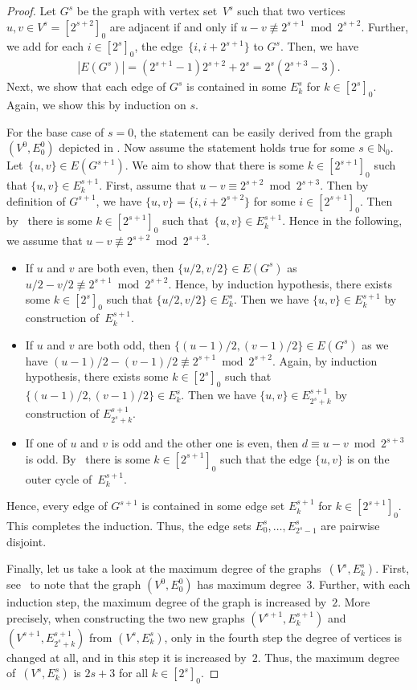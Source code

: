 \documentclass[unicode,runningheads,envcountsame,a4paper,dvipsnames,12pt]{llncs}
\newcommand{\N}{\mathbb{N}}
\begin{document}
\begin{proof}
		Let $G^s$ be the graph with vertex set~\(V^s\) such that two vertices $u, v \in V^{s} = [2^{s+2}]_0$ are adjacent if and only if $u-v \not\equiv 2^{s+1} \bmod 2^{s+2}$.
		Further, we add for each $i \in [2^{s}]_0$, the edge~$\{i,i+2^{s+1}\}$ to $G^s$. Then, we have
		\begin{align*}
			|E(G^s)|=\left(2^{s+1}-1\right)2^{s+2}+2^{s}=2^{s}(2^{s+3}-3).
		\end{align*} Next, we show that each edge of $G^s$ is contained in some \(E^s_k\) for \(k \in [2^s]_0\). Again, we show this by induction on \(s\). 
		
		For the base case of \(s=0\), the statement can be easily derived from the graph~\((V^0,E^0_0)\) depicted in . Now assume the statement holds true for some \(s \in \N_0\). Let~\(\{u,v\} \in E(G^{s+1})\). We aim to show that there is some \(k \in [2^{s+1}]_0\) such that \(\{u,v\} \in E^{s+1}_k.\) First, assume that \(u-v \equiv 2^{s+2} \bmod 2^{s+3}\). Then by definition of \(G^{s+1}\), we have \(\{u,v\}=\{i,i+2^{s+2}\}\) for some \(i \in [2^{s+1}]_0\). Then by~ there is some \(k \in [2^{s+1}]_0\) such that~\(\{u,v\} \in E^{s+1}_k.\) Hence in the following, we assume that \(u-v \not \equiv 2^{s+2} \bmod 2^{s+3}\).
		\begin{itemize}
			\item If \(u\) and \(v\) are both even, then \(\{u/2,v/2\} \in E(G^{s})\) as \(u/2-v/2 \not \equiv 2^{s+1} \bmod 2^{s+2}\). Hence, by induction hypothesis, there exists some \(k \in [2^s]_0\) such that \(\{u/2,v/2\} \in E_k^s\). Then we have \(\{u,v\} \in E_k^{s+1}\) by construction of~\(E_k^{s+1}\).
			\item If \(u\) and \(v\) are both odd, then \(\{(u-1)/2,(v-1)/2\} \in E(G^{s})\) as we have \((u-1)/2-(v-1)/2 \not \equiv 2^{s+1} \bmod 2^{s+2}\). Again, by induction hypothesis, there exists some \(k \in [2^s]_0\) such that \(\{(u-1)/2,(v-1)/2\} \in E_k^s\). Then we have \(\{u,v\} \in E_{2^s+k}^{s+1}\) by construction of \(E_{2^s+k}^{s+1}\).
			\item If one of \(u\) and \(v\) is odd and the other one is even, then \(d \equiv u-v \bmod 2^{s+3}\) is odd. By~ there is some \(k \in [2^{s+1}]_0\) such that the edge \(\{u,v\}\) is on the outer cycle of~\(E^{s+1}_k\).
		\end{itemize}
		Hence, every edge of \(G^{s+1}\) is contained in some edge set \(E^{s+1}_k\) for \(k \in [2^{s+1}]_0\). This completes the induction. Thus, the edge sets \(E^s_0, \dots, E^{s}_{2^s-1}\) are pairwise disjoint. 
		
		Finally, let us take a look at the maximum degree of the graphs~\((V^s,E^s_k)\). First, see~ to note that the graph \((V^0,E_0^0)\) has maximum degree~3. Further, with each induction step, the maximum degree of the graph is increased by~$2$. More precisely, when constructing the two new graphs $(V^{s+1}, E_{k}^{s+1})$ and~$(V^{s+1}, E_{2^{s}+k}^{s+1})$ from $(V^{s}, E_{k}^{s})$, only in the fourth step the degree of vertices is changed at all, and in this step it is increased by~$2$. Thus, the maximum degree of~\((V^s,E^s_k)\) is \(2s+3\) for all \(k \in [2^s]_0\).
	\end{proof}
	
\end{document}

